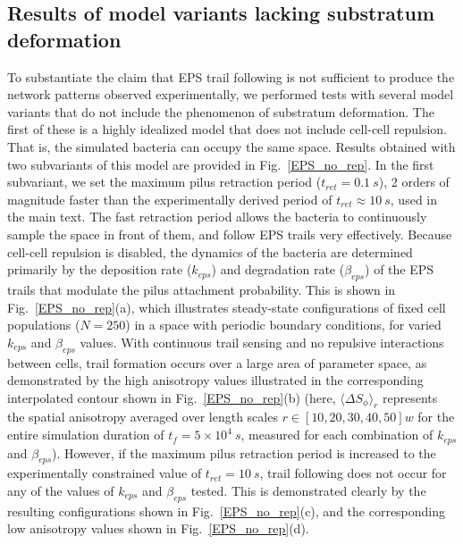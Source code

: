 \documentclass[aps,prl,numerical,reprint,superscriptaddress,showpacs]{revtex4-1}
\begin{document}


\subsection{Results of model variants lacking substratum deformation}

To substantiate the claim that EPS trail following is not sufficient to produce the network patterns observed experimentally, we performed tests with several model variants that do not include the phenomenon of substratum deformation. The first of these is a highly idealized model that does not include cell-cell repulsion. That is, the simulated bacteria can occupy the same space. Results obtained with two subvariants of this model are provided in Fig.~\ref{EPS_no_rep}. In the first subvariant, we set the maximum pilus retraction period ($t_{ret} = 0.1~s$), 2 orders of magnitude faster than the experimentally derived period of $t_{ret}\approx 10~s$, used in the main text. The fast retraction period allows the bacteria to continuously sample the space in front of them, and follow EPS trails very effectively. Because cell-cell repulsion is disabled, the dynamics of the bacteria are determined primarily by the deposition rate ($k_{eps}$) and degradation rate ($\beta_{eps}$) of the EPS trails that modulate the pilus attachment probability. This is shown in Fig.~\ref{EPS_no_rep}(a), which illustrates steady-state configurations of fixed cell populations ($N = 250$) in a space with periodic boundary conditions, for varied $k_{eps}$ and $\beta_{eps}$ values. With continuous trail sensing and no repulsive interactions between cells, trail formation occurs over a large area of parameter space, as demonstrated by the high anisotropy values illustrated in the corresponding interpolated contour shown in Fig.~\ref{EPS_no_rep}(b) (here, $\langle \Delta S_{\phi}\rangle_{r}$ represents the spatial anisotropy averaged over length scales $r \in [10, 20, 30, 40, 50]w$ for the entire simulation duration of $t_f = 5 \times 10^4~s$, measured for each combination of $k_{eps}$ and $\beta_{eps}$). However, if the maximum pilus retraction period is increased to the experimentally constrained value of $t_{ret} = 10~s$, trail following does not occur for any of the values of $k_{eps}$ and $\beta_{eps}$ tested. This is demonstrated clearly by the resulting configurations shown in Fig.~\ref{EPS_no_rep}(c), and the corresponding low anisotropy values shown in Fig.~\ref{EPS_no_rep}(d).  
\end{document}
